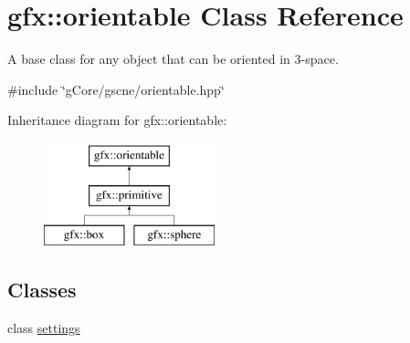 \hypertarget{classgfx_1_1orientable}{\section{gfx\-:\-:orientable Class Reference}
\label{classgfx_1_1orientable}
}


A base class for any object that can be oriented in 3-\/space.  




{\ttfamily \#include \char`\"{}g\-Core/gscne/orientable.\-hpp\char`\"{}}

Inheritance diagram for gfx\-:\-:orientable\-:\begin{figure}[H]
\begin{center}
\leavevmode
\includegraphics[height=3.000000cm]{classgfx_1_1orientable}
\end{center}
\end{figure}
\subsection*{Classes}
\begin{DoxyCompactItemize}
\item 
class \hyperlink{classgfx_1_1orientable_1_1settings}{settings}
\end{DoxyCompactItemize}
